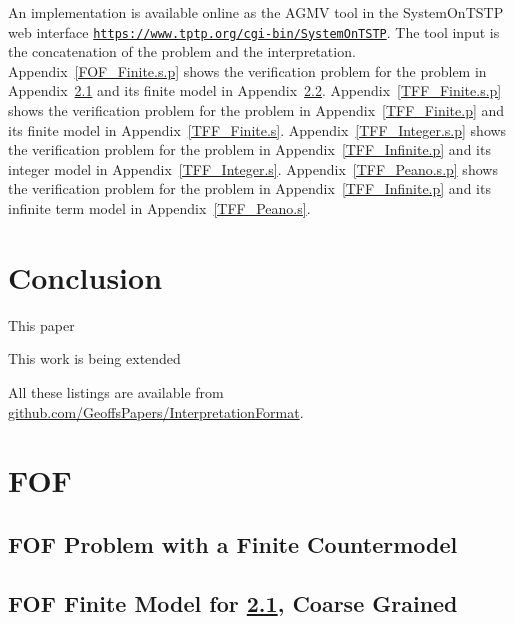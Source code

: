 \documentclass{easychair}
\newcommand{\smalltt}[1]{\small \texttt{#1}}
\begin{document}
An implementation is available online as the AGMV tool in the SystemOnTSTP \cite{Sut07-CSR} 
web interface {\smalltt{\url{https://www.tptp.org/cgi-bin/SystemOnTSTP}}}.
The tool input is the concatenation of the problem and the interpretation.
Appendix~\ref{FOF_Finite.s.p} shows the verification problem for the problem in 
Appendix~\ref{FOF_Finite.p} and its finite model in Appendix~\ref{FOF_Finite.s}.
Appendix~\ref{TFF_Finite.s.p} shows the verification problem for the problem in 
Appendix~\ref{TFF_Finite.p} and its finite model in Appendix~\ref{TFF_Finite.s}.
Appendix~\ref{TFF_Integer.s.p} shows the verification problem for the problem in 
Appendix~\ref{TFF_Infinite.p} and its integer model in Appendix~\ref{TFF_Integer.s}.
Appendix~\ref{TFF_Peano.s.p} shows the verification problem for the problem in 
Appendix~\ref{TFF_Infinite.p} and its infinite term model in Appendix~\ref{TFF_Peano.s}.

\section{Conclusion}
\label{Conclusion}

This paper 

This work is being extended 



\newpage
\appendix

All these listings are available from
\href{https://github.com/GeoffsPapers/InterpretationFormat}{github.com/GeoffsPapers/InterpretationFormat}.

\section{FOF}
\label{FOF}

\subsection{FOF Problem with a Finite Countermodel}
\label{FOF_Finite.p}
\begin{small}

\end{small}

\newpage
\subsection{FOF Finite Model for \ref{FOF_Finite.p}, Coarse Grained}
\label{FOF_Finite.s}
\begin{small}

\end{small}
\end{document}
